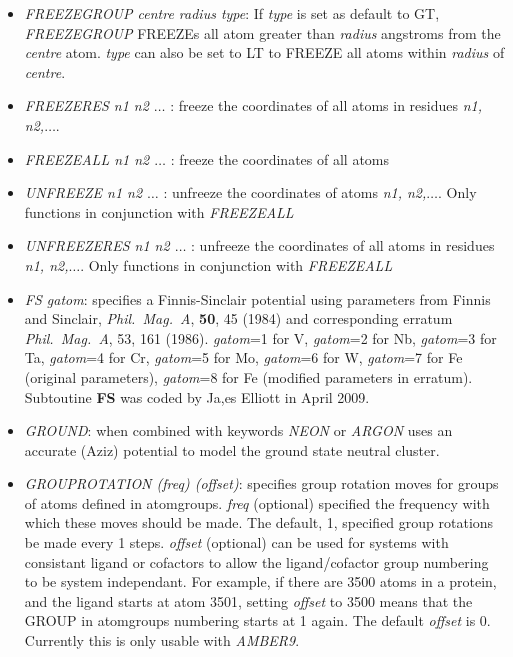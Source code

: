 \documentclass[12pt,a4paper,dvips]{article}
\begin{document}
\begin{itemize}
\item {\it FREEZEGROUP centre radius type\/}: If {\it type} is set as default to {\textrm GT}, {\it FREEZEGROUP\/} FREEZEs all atom greater than {\it radius} angstroms from the {\it centre} atom. {\it type} can also be set to LT to FREEZE all atoms within {\it radius} of {\it centre}.

\item {\it FREEZERES n1 n2 $\ldots$ \/}: freeze the coordinates of all atoms in residues {\it n1, n2,$\ldots$}.

\item {\it FREEZEALL n1 n2 $\ldots$ \/}: freeze the coordinates of all atoms 

\item {\it UNFREEZE n1 n2 $\ldots$ \/}: unfreeze the coordinates of atoms {\it n1, n2,$\ldots$}. Only functions in conjunction with 
{\it FREEZEALL\/}

\item {\it UNFREEZERES n1 n2 $\ldots$ \/}: unfreeze the coordinates of all atoms in residues {\it n1, n2,$\ldots$}. Only functions in conjunction with 
{\it FREEZEALL\/}

\item{\it FS gatom}: specifies a Finnis-Sinclair potential using parameters from 
Finnis and Sinclair, {\it Phil.~Mag.~A}, {\bf 50}, 45 (1984) 
and corresponding erratum {\it Phil.~Mag.~A}, 53, 161 (1986). 
{\it gatom}=1 for V, {\it gatom}=2 for Nb, {\it gatom}=3 for Ta, {\it gatom}=4 
for Cr, {\it gatom}=5 for Mo, {\it gatom}=6 for W, {\it gatom}=7 
for Fe (original parameters), {\it gatom}=8 for Fe (modified parameters in erratum). 
Subtoutine {\bf FS} was coded by Ja,es Elliott in April 2009.

\item {\it GROUND\/}: when combined with keywords {\it NEON\/} or {\it ARGON\/}
uses an accurate (Aziz) potential to model the ground state neutral cluster.

\item {\it GROUPROTATION (freq) (offset)\/}: specifies group rotation moves for groups of atoms defined in {\rm atomgroups}. {\it freq\/} 
(optional) specified the frequency with which these moves should be made. The default, 1, specified group rotations be made every 1 steps. 
{\it offset\/} (optional) can be used for systems with consistant ligand or cofactors to allow the ligand/cofactor group numbering to be
system independant. For example, if there are 3500 atoms in a protein, and the ligand starts at atom 3501, setting {\it offset} to 3500 means
that the GROUP in {\textrm atomgroups} numbering starts at 1 again. The default {\it offset\/} is 0. Currently this is only usable with 
{\it AMBER9\/}.


\end{itemize}
\end{document}
